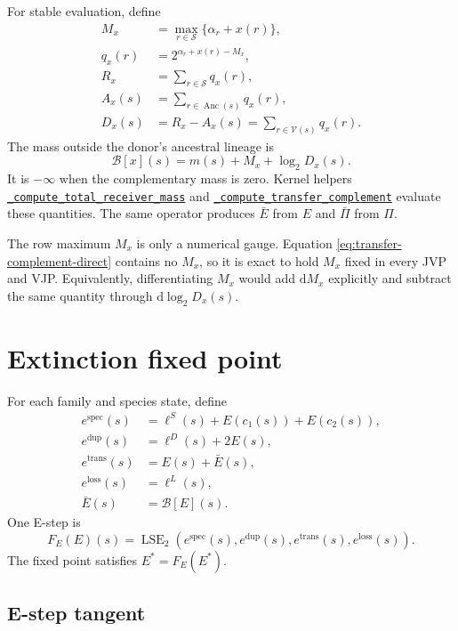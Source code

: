 \documentclass[11pt]{article}
\newcommand{\LSE}{\operatorname{LSE}_2}
\newcommand{\Anc}{\operatorname{Anc}}
\newcommand{\dd}{\mathrm{d}}
\newcommand{\kernelref}[2]{\href{../../gpurec/core/kernels/#1}{\nolinkurl{#2}}}
\begin{document}
For stable evaluation, define
\begin{align}
  M_x &= \max_{r\in\mathcal S}\{\alpha_r+x(r)\}, \\
  q_x(r)&=2^{\alpha_r+x(r)-M_x},\\
  R_x &= \sum_{r\in\mathcal S}q_x(r), \\
  A_x(s) &= \sum_{r\in\Anc(s)}q_x(r),\\
  D_x(s)&=R_x-A_x(s)
         =\sum_{r\in\mathcal V(s)}q_x(r).
\end{align}
The mass outside the donor's ancestral lineage is
\begin{equation}
  \mathcal B[x](s)
  = m(s)+M_x+\log_2 D_x(s).
  \label{eq:transfer-complement}
\end{equation}
It is $-\infty$ when the complementary mass is zero.  Kernel helpers
\kernelref{pi_forward.py}{_compute_total_receiver_mass} and
\kernelref{pi_forward.py}{_compute_transfer_complement} evaluate these quantities.
The same operator produces $\bar E$ from $E$ and $\bar\Pi$ from $\Pi$.

The row maximum $M_x$ is only a numerical gauge.  Equation
\eqref{eq:transfer-complement-direct} contains no $M_x$, so it is exact to hold
$M_x$ fixed in every JVP and VJP.  Equivalently, differentiating $M_x$ would
add $\dd M_x$ explicitly and subtract the same quantity through
$\dd\log_2 D_x(s)$.

\section{Extinction fixed point}

For each family and species state, define
\begin{align}
  e^{\mathrm{spec}}(s) &= \ell^S(s)+E(c_1(s))+E(c_2(s)), \\
  e^{\mathrm{dup}}(s) &= \ell^D(s)+2E(s), \\
  e^{\mathrm{trans}}(s) &= E(s)+\bar E(s), \\
  e^{\mathrm{loss}}(s) &= \ell^L(s), \\
  \bar E(s) &= \mathcal B[E](s).
\end{align}
One E-step is
\begin{equation}
  F_E(E)(s)=\LSE\!\left(
    e^{\mathrm{spec}}(s),e^{\mathrm{dup}}(s),
    e^{\mathrm{trans}}(s),e^{\mathrm{loss}}(s)
  \right).
  \label{eq:e-step}
\end{equation}
The fixed point satisfies $E^*=F_E(E^*)$.

\subsection{E-step tangent}
\end{document}
